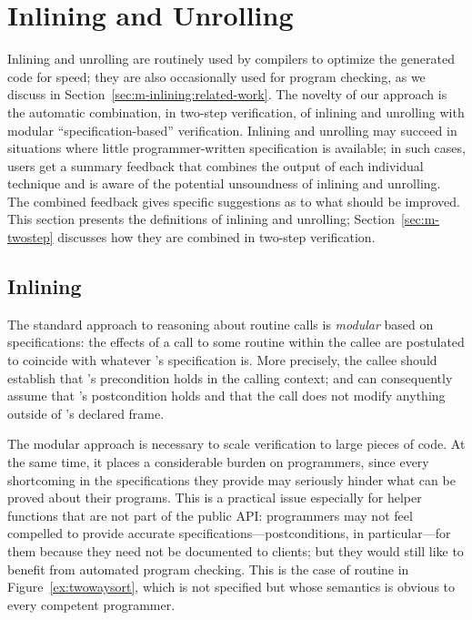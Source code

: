 \section{Inlining and Unrolling}
\label{sec:m-inlining}


Inlining and unrolling are routinely used by compilers to optimize the generated code for speed; they are also occasionally used for program checking, as we discuss in Section~\ref{sec:m-inlining:related-work}.
The novelty of our approach is the automatic combination, in two-step verification, of inlining and unrolling with modular ``specification-based'' verification.
Inlining and unrolling may succeed in situations where little programmer-written specification is available; in such cases, users get a summary feedback that combines the output of each individual technique and is aware of the potential unsoundness of inlining and unrolling.
The combined feedback gives specific suggestions as to what should be improved.
This section presents the definitions of inlining and unrolling; Section~\ref{sec:m-twostep} discusses how they are combined in two-step verification.


\subsection{Inlining} \label{sec:inlining}

The standard approach to reasoning about routine calls is \emph{modular} based on specifications: the effects of a call to some routine  within the callee are postulated to coincide with whatever 's specification is.
More precisely, the callee should establish that 's precondition holds in the calling context; and can consequently assume that 's postcondition holds and that the call does not modify anything outside of 's declared frame.

The modular approach is necessary to scale verification to large pieces of code.
At the same time, it places a considerable burden on programmers, since every shortcoming in the specifications they provide may seriously hinder what can be proved about their programs.
This is a practical issue especially for helper functions that are not part of the public API: programmers may not feel compelled to provide accurate specifications---postconditions, in particular---for them because they need not be documented to clients; but they would still like to benefit from automated program checking.
This is the case of routine  in Figure~\ref{ex:twowaysort}, which is not specified but whose semantics is obvious to every competent programmer.

